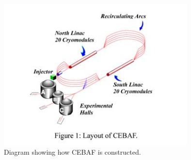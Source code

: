 \begin{figure}
  \centering
  \includegraphics[width=10cm]{image/cebaf.jpg}
  \caption{ Diagram showing how CEBAF is constructed.  }
  \label{fig:jlab}
\end{figure}


